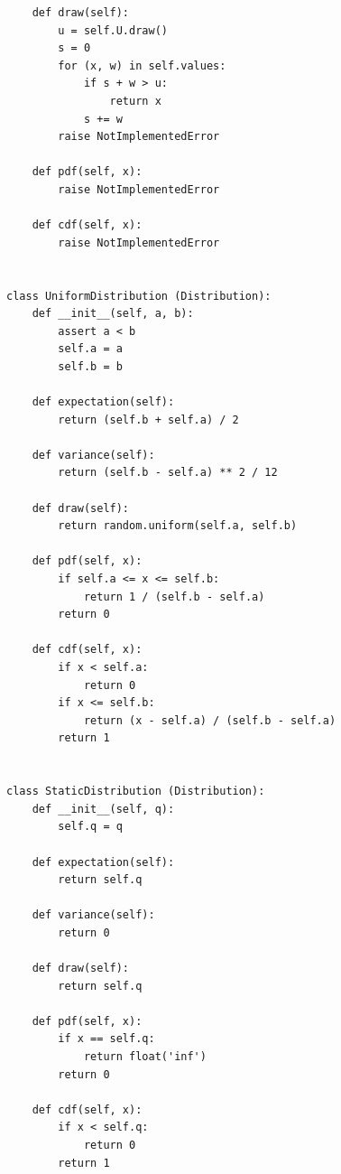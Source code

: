 \documentclass[paper=a4, fontsize=11pt]{scrartcl} %
\numberwithin{equation}{section} %
\numberwithin{figure}{section} %
\numberwithin{table}{section} %
\begin{document}
\begin{lstlisting}
    def draw(self):
        u = self.U.draw()
        s = 0
        for (x, w) in self.values:
            if s + w > u:
                return x
            s += w
        raise NotImplementedError

    def pdf(self, x):
        raise NotImplementedError

    def cdf(self, x):
        raise NotImplementedError


class UniformDistribution (Distribution):
    def __init__(self, a, b):
        assert a < b
        self.a = a
        self.b = b

    def expectation(self):
        return (self.b + self.a) / 2

    def variance(self):
        return (self.b - self.a) ** 2 / 12

    def draw(self):
        return random.uniform(self.a, self.b)

    def pdf(self, x):
        if self.a <= x <= self.b:
            return 1 / (self.b - self.a)
        return 0

    def cdf(self, x):
        if x < self.a:
            return 0
        if x <= self.b:
            return (x - self.a) / (self.b - self.a)
        return 1


class StaticDistribution (Distribution):
    def __init__(self, q):
        self.q = q

    def expectation(self):
        return self.q

    def variance(self):
        return 0

    def draw(self):
        return self.q

    def pdf(self, x):
        if x == self.q:
            return float('inf')
        return 0

    def cdf(self, x):
        if x < self.q:
            return 0
        return 1

\end{lstlisting}
\end{document}
